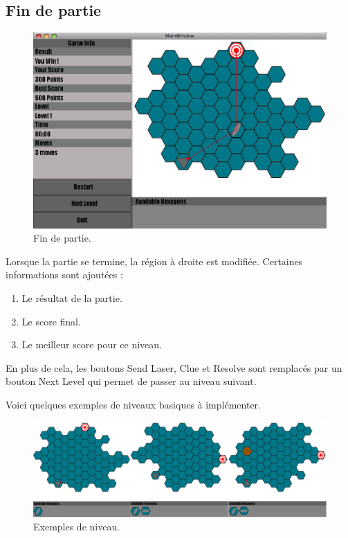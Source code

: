 \documentclass[]{article}
\begin{document}
\subsection{Fin de partie}\label{sec:game4}
\begin{figure}[!htb]
\begin{center}
  \includegraphics[width=\textwidth]{Game4.png}
  \caption{Fin de partie.}\label{fig:game4}
\end{center}
\end{figure}
Lorsque la partie se termine, la région à droite est modifiée. Certaines informations sont ajoutées :
\begin{enumerate}
\item Le résultat de la partie.
\item Le score final.
\item Le meilleur score pour ce niveau.
\end{enumerate}
En plus de cela, les boutons Send Laser, Clue et Resolve sont remplacés par un bouton Next Level qui permet de passer au niveau suivant.

\newpage
Voici quelques exemples de niveaux basiques à implémenter.
\begin{figure}[!htb]
\begin{center}
  \includegraphics[width=\textwidth]{Levels.png}
  \caption{Exemples de niveau.}\label{fig:levels}
\end{center}
\end{figure}
\newpage
\end{document}
